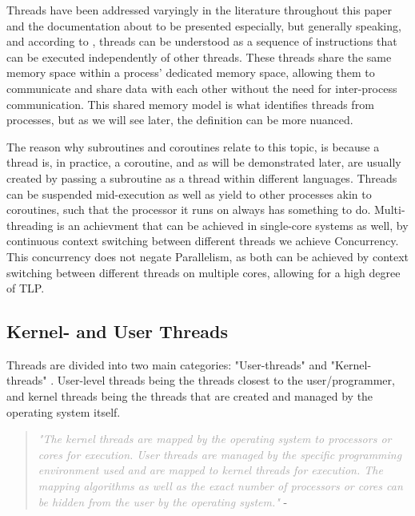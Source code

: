 \documentclass[12pt,a4paper]{article}
\begin{document}
Threads have been addressed varyingly in the literature throughout this paper and the documentation about to be presented especially, but generally speaking, and according to \cite[4, 27]{Rauber2023}, threads can be understood as a sequence of instructions that can be executed independently of other threads. These threads share the same memory space within a process' dedicated memory space, allowing them to communicate and share data with each other without the need for inter-process communication. This shared memory model is what identifies threads from processes, but as we will see later, the definition can be more nuanced.

The reason why subroutines and coroutines relate to this topic, is because a thread is, in practice, a coroutine, and as will be demonstrated later, are usually created by passing a subroutine as a thread within different languages. Threads can be suspended mid-execution as well as yield to other processes akin to coroutines, such that the processor it runs on always has something to do. Multi-threading is an achievment that can be achieved in single-core systems as well, by continuous context switching between different threads\parencite{Rauber2023} we achieve Concurrency. This concurrency does not negate Parallelism, as both can be achieved by context switching between different threads on multiple cores, allowing for a high degree of TLP.

\subsection{Kernel- and User Threads}

Threads are divided into two main categories: "User-threads" and "Kernel-threads" \parencite[p. 27]{Rauber2023}. User-level threads being the threads closest to the user/programmer, and kernel threads being the threads that are created and managed by the operating system itself.

\begin{quote}
    \textit{\textcolor{darkgray}{"The kernel threads are mapped by the operating system to processors or cores for execution. User threads are managed by the specific programming environment used and are mapped to kernel threads for execution. The mapping algorithms as well as the exact number of processors or cores can be hidden from the user by the operating system."}} - \parencite[p. 27]{Rauber2023}
\end{quote}
\end{document}
